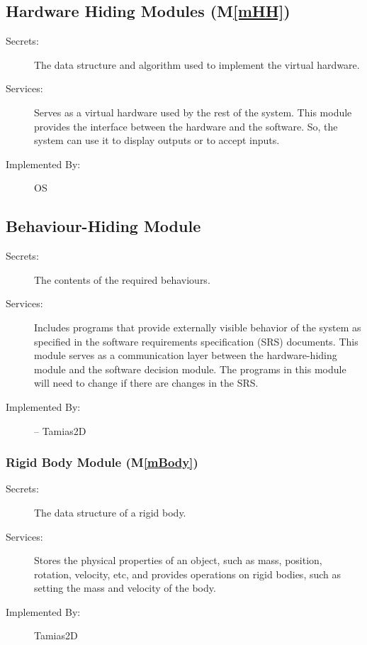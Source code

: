 \documentclass[12pt]{article}
\newcommand{\mref}[1]{M\ref{#1}}
\newcommand{\progname}{Tamias2D}
\begin{document}
\subsection{Hardware Hiding Modules (\mref{mHH})}

\begin{description}
\item[Secrets:]The data structure and algorithm used to implement the virtual
  hardware.
\item[Services:] Serves as a virtual hardware used by the rest of the
  system. This module provides the interface between the hardware and the
  software. So, the system can use it to display outputs or to accept inputs.
\item[Implemented By:] OS
\end{description}

\subsection{Behaviour-Hiding Module}

\begin{description}
\item[Secrets:]The contents of the required behaviours.
\item[Services:]Includes programs that provide externally visible behavior of
  the system as specified in the software requirements specification (SRS)
  documents. This module serves as a communication layer between the
  hardware-hiding module and the software decision module. The programs in this module will need to change if there are changes in the SRS.
\item[Implemented By:] -- {\progname}
\end{description}

\subsubsection{Rigid Body Module (\mref{mBody})}

\begin{description}
\item[Secrets:]The data structure of a rigid body.
\item[Services:]Stores the physical properties of an object, such as mass, 
position, rotation, velocity, etc, and provides operations on rigid bodies, such as setting the mass and velocity of the body.

\item[Implemented By:] {\progname}
\end{description}
\end{document}
